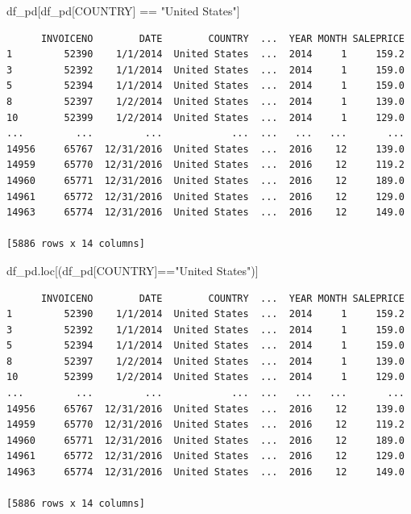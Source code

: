 \documentclass[
  letterpaper,
  DIV=11,
  numbers=noendperiod]{scrreprt}
\newenvironment{Shaded}{\begin{snugshade}}{\end{snugshade}}
\newcommand{\NormalTok}[1]{\textcolor[rgb]{0.00,0.23,0.31}{#1}}
\newcommand{\OperatorTok}[1]{\textcolor[rgb]{0.37,0.37,0.37}{#1}}
\newcommand{\StringTok}[1]{\textcolor[rgb]{0.13,0.47,0.30}{#1}}
\begin{document}
\begin{Shaded}
\begin{Highlighting}[]
\NormalTok{df\_pd[df\_pd[}\StringTok{\textquotesingle{}COUNTRY\textquotesingle{}}\NormalTok{] }\OperatorTok{==} \StringTok{"United States"}\NormalTok{]}
\end{Highlighting}
\end{Shaded}

\begin{verbatim}
      INVOICENO        DATE        COUNTRY  ...  YEAR MONTH SALEPRICE
1         52390    1/1/2014  United States  ...  2014     1     159.2
3         52392    1/1/2014  United States  ...  2014     1     159.0
5         52394    1/1/2014  United States  ...  2014     1     159.0
8         52397    1/2/2014  United States  ...  2014     1     139.0
10        52399    1/2/2014  United States  ...  2014     1     129.0
...         ...         ...            ...  ...   ...   ...       ...
14956     65767  12/31/2016  United States  ...  2016    12     139.0
14959     65770  12/31/2016  United States  ...  2016    12     119.2
14960     65771  12/31/2016  United States  ...  2016    12     189.0
14961     65772  12/31/2016  United States  ...  2016    12     129.0
14963     65774  12/31/2016  United States  ...  2016    12     149.0

[5886 rows x 14 columns]
\end{verbatim}

\begin{Shaded}
\begin{Highlighting}[]
\NormalTok{df\_pd.loc[(df\_pd[}\StringTok{\textquotesingle{}COUNTRY\textquotesingle{}}\NormalTok{]}\OperatorTok{==}\StringTok{"United States"}\NormalTok{)]}
\end{Highlighting}
\end{Shaded}

\begin{verbatim}
      INVOICENO        DATE        COUNTRY  ...  YEAR MONTH SALEPRICE
1         52390    1/1/2014  United States  ...  2014     1     159.2
3         52392    1/1/2014  United States  ...  2014     1     159.0
5         52394    1/1/2014  United States  ...  2014     1     159.0
8         52397    1/2/2014  United States  ...  2014     1     139.0
10        52399    1/2/2014  United States  ...  2014     1     129.0
...         ...         ...            ...  ...   ...   ...       ...
14956     65767  12/31/2016  United States  ...  2016    12     139.0
14959     65770  12/31/2016  United States  ...  2016    12     119.2
14960     65771  12/31/2016  United States  ...  2016    12     189.0
14961     65772  12/31/2016  United States  ...  2016    12     129.0
14963     65774  12/31/2016  United States  ...  2016    12     149.0

[5886 rows x 14 columns]
\end{verbatim}
\end{document}
